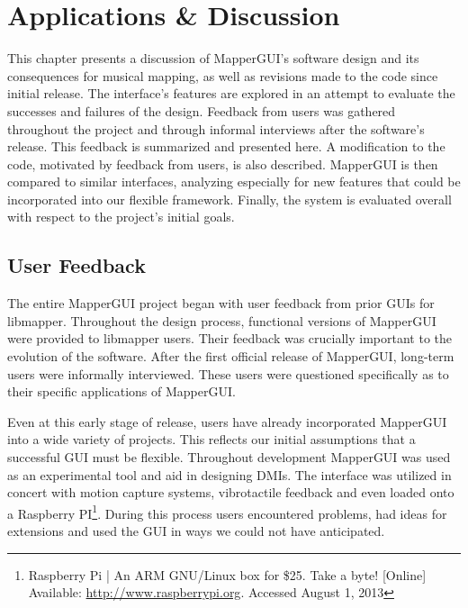 \chapter{Applications \& Discussion}

This chapter presents a discussion of MapperGUI's software design and its consequences for musical mapping, as well as revisions made to the code since initial release. The interface's features are explored in an attempt to evaluate the successes and failures of the design. Feedback from users was gathered throughout the project and through informal interviews after the software's release. This feedback is summarized and presented here. A modification to the code, motivated by feedback from users, is also described. MapperGUI is then compared to similar interfaces, analyzing especially for new features that could be incorporated into our flexible framework. Finally, the system is evaluated overall with respect to the project's initial goals.


\section{User Feedback} %
\label{sec:user_feedback}

The entire MapperGUI project began with user feedback from prior GUIs for libmapper. Throughout the design process, functional versions of MapperGUI were provided to libmapper users. Their feedback was crucially important to the evolution of the software. After the first official release of MapperGUI, long-term users were informally interviewed. These users were questioned specifically as to their specific applications of MapperGUI.

Even at this early stage of release, users have already incorporated MapperGUI into a wide variety of projects. This reflects our initial assumptions that a successful GUI must be flexible. Throughout development MapperGUI was used as an experimental tool and aid in designing DMIs. The interface was utilized in concert with motion capture systems, vibrotactile feedback and even loaded onto a Raspberry PI\footnote{Raspberry Pi | An ARM GNU/Linux box for \$25. Take a byte! [Online] Available: \url{http://www.raspberrypi.org}. Accessed August 1, 2013}. During this process users encountered problems, had ideas for extensions and used the GUI in ways we could not have anticipated.



